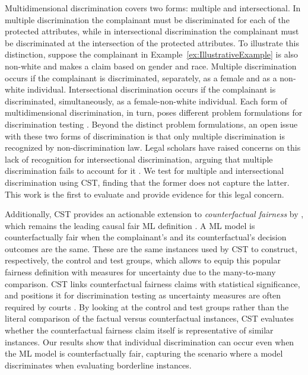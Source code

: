 Multidimensional discrimination covers two forms: multiple and intersectional. 
In multiple discrimination the complainant must be discriminated for each of the protected attributes, while in intersectional discrimination the complainant must be discriminated at the intersection of the protected attributes.
To illustrate this distinction, suppose the complainant in Example~\ref{ex:IllustrativeExample} is also non-white and makes a claim based on gender and race. 
Multiple discrimination occurs if the complainant is discriminated, separately, as a female and as a non-white individual.
Intersectional discrimination occurs if the complainant is discriminated, simultaneously, as a female-non-white individual.
Each form of multidimensional discrimination, in turn, poses different problem formulations for discrimination testing \parencite{DBLP:conf/fat/0001HN23, WangRR22}.
Beyond the distinct problem formulations, an open issue with these two forms of discrimination is that only multiple discrimination is recognized by non-discrimination law. 
Legal scholars have raised concerns on this lack of recognition for intersectional discrimination, arguing that multiple discrimination fails to account for it \parencite{Xenidis2020_TunningEULaw}.
We test for multiple and intersectional discrimination using CST, finding that the former does not capture the latter.
This work is the first to evaluate and provide evidence for this legal concern.

Additionally, CST provides an actionable extension to \textit{counterfactual fairness} by \textcite{Kusner2017CF}, which remains the leading causal fair ML definition \parencite{DBLP:journals/jlap/MakhloufZP24}.
A ML model is counterfactually fair when the complainant's and its counterfactual's decision outcomes are the same. 
These are the same instances used by CST to construct, respectively, the control and test groups, which allows to equip this popular fairness definition with measures for uncertainty due to the many-to-many comparison. 
CST links counterfactual fairness claims with statistical significance, and
positions it for discrimination testing as uncertainty measures are often required by courts \parencite{EU2018_NonDiscriminationLaw}.
By looking at the control and test groups rather than the literal comparison of the factual versus counterfactual instances, CST evaluates whether the counterfactual fairness claim itself is representative of similar instances.
Our results show that individual discrimination can occur even when the ML model is counterfactually fair, capturing the scenario where a model discriminates when evaluating borderline instances.

